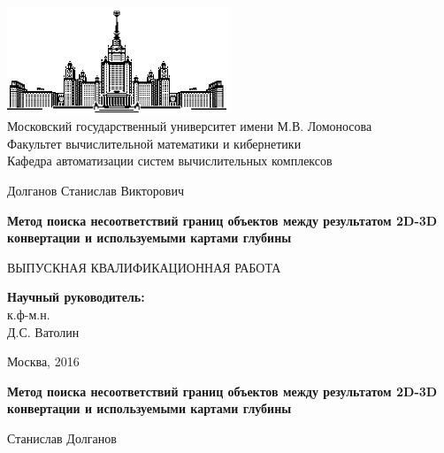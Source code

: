 \documentclass[14pt, a4paper]{extarticle}
\begin{document}
\thispagestyle{empty}

\begin{center}
\ \vspace{-2.5cm}

\includegraphics[width=0.5\textwidth]{msu}\\
{Московский государственный университет имени М.В. Ломоносова}\\
Факультет вычислительной математики и кибернетики\\
Кафедра автоматизации систем вычислительных комплексов

\vspace{2.5cm}

{\Large Долганов Станислав Викторович}

\vspace{1cm}

{\Large\bfseries
Метод поиска несоответствий границ объектов между результатом 2D-3D конвертации 
и используемыми картами глубины\\}

\vspace{1cm}

{\large ВЫПУСКНАЯ КВАЛИФИКАЦИОННАЯ  РАБОТА}
\end{center}

\vfill

\begin{flushright}
  \textbf{Научный руководитель:}\\
  к.ф-м.н.\\
  Д.С. Ватолин
\end{flushright}

\vfill

\begin{center}
Москва, 2016
\end{center}

\enlargethispage{4\baselineskip}

\newpage

\textbf{Метод поиска несоответствий границ объектов между результатом 2D-3D конвертации 
и используемыми картами глубины}

\vspace{0.5cm}
Станислав Долганов
\vspace{0.5cm}
\end{document}

